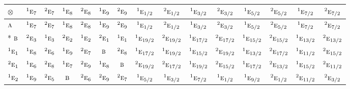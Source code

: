 \documentclass[10pt,a4paper]{article}
\numberwithin{equation}{section}
\newcommand{\irr}[1]{\text{\normalfont\scshape #1}}
\newcommand{\conjpair}[1]{{}^{#1}}
\newcommand{\irrprod}{\otimes}
\begin{document}
{\small\setlength{\tabcolsep}{3pt}\begin{longtable}{@{}lcccccccccccccc@{}}\toprule
$\irrprod$ & $\conjpair{1}\irr{e}_{7}$ & $\conjpair{2}\irr{e}_{7}$ & $\conjpair{1}\irr{e}_{8}$ & $\conjpair{2}\irr{e}_{8}$ & $\conjpair{1}\irr{e}_{9}$ & $\conjpair{2}\irr{e}_{9}$ & $\conjpair{1}\irr{e}_{1/2}$ & $\conjpair{2}\irr{e}_{1/2}$ & $\conjpair{1}\irr{e}_{3/2}$ & $\conjpair{2}\irr{e}_{3/2}$ & $\conjpair{1}\irr{e}_{5/2}$ & $\conjpair{2}\irr{e}_{5/2}$ & $\conjpair{1}\irr{e}_{7/2}$ & $\conjpair{2}\irr{e}_{7/2}$\\\midrule\endhead
\bottomrule\endfoot\endlastfoot
$\irr{a}$ & $\conjpair{1}\irr{e}_{7}$ & $\conjpair{2}\irr{e}_{7}$ & $\conjpair{1}\irr{e}_{8}$ & $\conjpair{2}\irr{e}_{8}$ & $\conjpair{1}\irr{e}_{9}$ & $\conjpair{2}\irr{e}_{9}$ & $\conjpair{1}\irr{e}_{1/2}$ & $\conjpair{2}\irr{e}_{1/2}$ & $\conjpair{1}\irr{e}_{3/2}$ & $\conjpair{2}\irr{e}_{3/2}$ & $\conjpair{1}\irr{e}_{5/2}$ & $\conjpair{2}\irr{e}_{5/2}$ & $\conjpair{1}\irr{e}_{7/2}$ & $\conjpair{2}\irr{e}_{7/2}$\\*
$\irr{b}$ & $\conjpair{2}\irr{e}_{3}$ & $\conjpair{1}\irr{e}_{3}$ & $\conjpair{2}\irr{e}_{2}$ & $\conjpair{1}\irr{e}_{2}$ & $\conjpair{2}\irr{e}_{1}$ & $\conjpair{1}\irr{e}_{1}$ & $\conjpair{1}\irr{e}_{19/2}$ & $\conjpair{2}\irr{e}_{19/2}$ & $\conjpair{1}\irr{e}_{17/2}$ & $\conjpair{2}\irr{e}_{17/2}$ & $\conjpair{1}\irr{e}_{15/2}$ & $\conjpair{2}\irr{e}_{15/2}$ & $\conjpair{1}\irr{e}_{13/2}$ & $\conjpair{2}\irr{e}_{13/2}$\\
$\conjpair{1}\irr{e}_{1}$ & $\conjpair{1}\irr{e}_{8}$ & $\conjpair{2}\irr{e}_{6}$ & $\conjpair{1}\irr{e}_{9}$ & $\conjpair{2}\irr{e}_{7}$ & $\irr{b}$ & $\conjpair{2}\irr{e}_{8}$ & $\conjpair{1}\irr{e}_{17/2}$ & $\conjpair{1}\irr{e}_{19/2}$ & $\conjpair{1}\irr{e}_{15/2}$ & $\conjpair{2}\irr{e}_{19/2}$ & $\conjpair{1}\irr{e}_{13/2}$ & $\conjpair{2}\irr{e}_{17/2}$ & $\conjpair{1}\irr{e}_{11/2}$ & $\conjpair{2}\irr{e}_{15/2}$\\
$\conjpair{2}\irr{e}_{1}$ & $\conjpair{1}\irr{e}_{6}$ & $\conjpair{2}\irr{e}_{8}$ & $\conjpair{1}\irr{e}_{7}$ & $\conjpair{2}\irr{e}_{9}$ & $\conjpair{1}\irr{e}_{8}$ & $\irr{b}$ & $\conjpair{2}\irr{e}_{19/2}$ & $\conjpair{2}\irr{e}_{17/2}$ & $\conjpair{1}\irr{e}_{19/2}$ & $\conjpair{2}\irr{e}_{15/2}$ & $\conjpair{1}\irr{e}_{17/2}$ & $\conjpair{2}\irr{e}_{13/2}$ & $\conjpair{1}\irr{e}_{15/2}$ & $\conjpair{2}\irr{e}_{11/2}$\\
$\conjpair{1}\irr{e}_{2}$ & $\conjpair{1}\irr{e}_{9}$ & $\conjpair{2}\irr{e}_{5}$ & $\irr{b}$ & $\conjpair{2}\irr{e}_{6}$ & $\conjpair{2}\irr{e}_{9}$ & $\conjpair{2}\irr{e}_{7}$ & $\conjpair{1}\irr{e}_{5/2}$ & $\conjpair{1}\irr{e}_{3/2}$ & $\conjpair{1}\irr{e}_{7/2}$ & $\conjpair{1}\irr{e}_{1/2}$ & $\conjpair{1}\irr{e}_{9/2}$ & $\conjpair{2}\irr{e}_{1/2}$ & $\conjpair{2}\irr{e}_{11/2}$ & $\conjpair{2}\irr{e}_{3/2}$\\

\end{longtable}}
\end{document}
